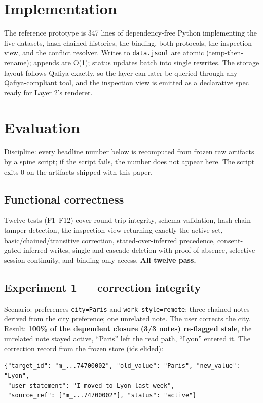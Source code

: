 \documentclass[11pt]{article}
\begin{document}
\section{Implementation}
The reference prototype is 347 lines of dependency-free Python implementing the five datasets, hash-chained histories, the binding, both protocols, the inspection view, and the conflict resolver. Writes to \texttt{data.jsonl} are atomic (temp-then-rename); appends are O(1); status updates batch into single rewrites. The storage layout follows Qafiya exactly, so the layer can later be queried through any Qafiya-compliant tool, and the inspection view is emitted as a declarative spec ready for Layer 2's renderer.

\section{Evaluation}
\label{sec:eval}
Discipline: every headline number below is recomputed from frozen raw artifacts by a spine script; if the script fails, the number does not appear here. The script exits 0 on the artifacts shipped with this paper.

\subsection{Functional correctness}
Twelve tests (F1--F12) cover round-trip integrity, schema validation, hash-chain tamper detection, the inspection view returning exactly the active set, basic/chained/transitive correction, stated-over-inferred precedence, consent-gated inferred writes, single and cascade deletion with proof of absence, selective session continuity, and binding-only access. \textbf{All twelve pass.}

\subsection{Experiment 1 --- correction integrity}
Scenario: preferences \texttt{city=Paris} and \texttt{work\_style=remote}; three chained notes derived from the city preference; one unrelated note. The user corrects the city. Result: \textbf{100\% of the dependent closure (3/3 notes) re-flagged stale}, the unrelated note stayed active, ``Paris'' left the read path, ``Lyon'' entered it. The correction record from the frozen store (ids elided):

\begin{lstlisting}
{"target_id": "m_...74700002", "old_value": "Paris", "new_value": "Lyon",
 "user_statement": "I moved to Lyon last week",
 "source_ref": ["m_...74700002"], "status": "active"}
\end{lstlisting}
\end{document}

